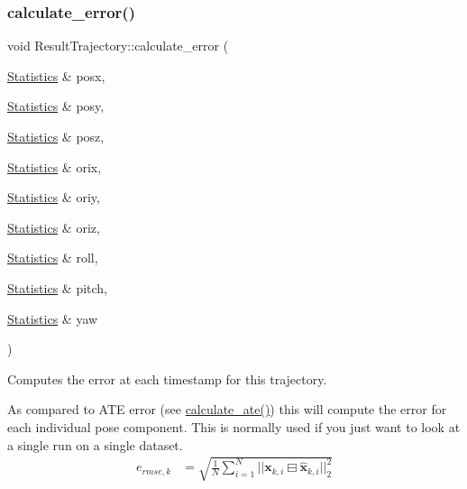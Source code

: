 \subsubsection{\texorpdfstring{calculate\+\_\+error()}{calculate\_error()}}
{\footnotesize\ttfamily void Result\+Trajectory\+::calculate\+\_\+error (\begin{DoxyParamCaption}\item[{\hyperlink{structov__eval_1_1Statistics}{Statistics} \&}]{posx,  }\item[{\hyperlink{structov__eval_1_1Statistics}{Statistics} \&}]{posy,  }\item[{\hyperlink{structov__eval_1_1Statistics}{Statistics} \&}]{posz,  }\item[{\hyperlink{structov__eval_1_1Statistics}{Statistics} \&}]{orix,  }\item[{\hyperlink{structov__eval_1_1Statistics}{Statistics} \&}]{oriy,  }\item[{\hyperlink{structov__eval_1_1Statistics}{Statistics} \&}]{oriz,  }\item[{\hyperlink{structov__eval_1_1Statistics}{Statistics} \&}]{roll,  }\item[{\hyperlink{structov__eval_1_1Statistics}{Statistics} \&}]{pitch,  }\item[{\hyperlink{structov__eval_1_1Statistics}{Statistics} \&}]{yaw }\end{DoxyParamCaption})}



Computes the error at each timestamp for this trajectory. 

As compared to A\+TE error (see \hyperlink{classov__eval_1_1ResultTrajectory_aa82df799f7eb6ccc6f7665cd7a383c40}{calculate\+\_\+ate()}) this will compute the error for each individual pose component. This is normally used if you just want to look at a single run on a single dataset. \begin{align*} e_{rmse,k} &= \sqrt{ \frac{1}{N} \sum_{i=1}^{N} ||\mathbf{x}_{k,i} \boxminus \hat{\mathbf{x}}_{k,i}||^2_{2} } \end{align*}


